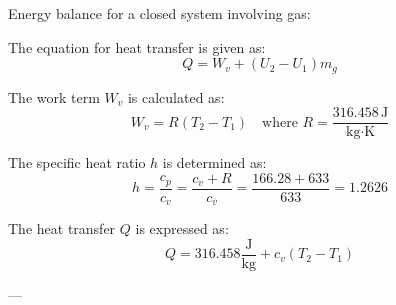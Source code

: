 Energy balance for a closed system involving gas:  

The equation for heat transfer is given as:  
\[
Q = W_v + (U_2 - U_1) m_g
\]  

The work term \( W_v \) is calculated as:  
\[
W_v = R (T_2 - T_1) \quad \text{where } R = \frac{316.458 \, \text{J}}{\text{kg·K}}
\]  

The specific heat ratio \( h \) is determined as:  
\[
h = \frac{c_p}{c_v} = \frac{c_v + R}{c_v} = \frac{166.28 + 633}{633} = 1.2626
\]  

The heat transfer \( Q \) is expressed as:  
\[
Q = 316.458 \frac{\text{J}}{\text{kg}} + c_v (T_2 - T_1)
\]  

---